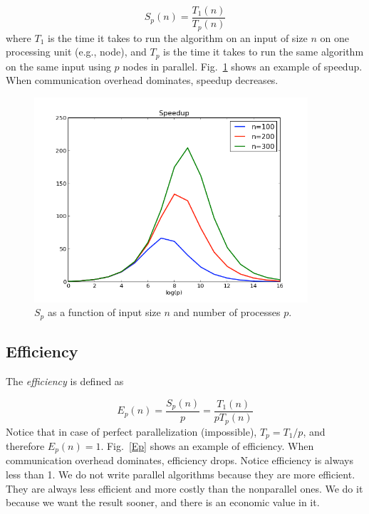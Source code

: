 \documentclass[justified,sixbynine]{tufte-book}
\theoremstyle{plain}%
\theoremstyle{definition}
\theoremstyle{remark}
\begin{document}
\begin{fullwidth}
\begin{equation}
S_p(n) = \frac{T_1(n)}{T_p(n)}
\end{equation}
where $T_1$ is the time it takes to run the algorithm on an input of size $n$ on one processing unit (e.g., node), and $T_p$ is the time it takes to run the same algorithm on the same input using $p$ nodes in parallel. Fig.~\ref{Sp} shows an example of speedup. When communication overhead dominates, speedup decreases.

\begin{figure}[ht]
\centering\includegraphics[width=4in]{images/Sp.png}
\caption{$S_p$ as a function of input size $n$ and number of processes $p$.\label{Sp}}
\end{figure}

\goodbreak\subsection{Efficiency}

The {\it efficiency} is defined as

\begin{equation}
E_p(n) = \frac{S_p(n)}{p} = \frac{T_1(n)}{p T_p(n)}
\end{equation}
Notice that in case of perfect parallelization (impossible), $T_p=T_1/p$, and therefore $E_p(n)=1$. Fig.~\ref{Ep} shows an example of efficiency. When communication overhead dominates, efficiency drops. Notice efficiency is always less than 1. We do not write parallel algorithms because they are more efficient. They are always less efficient and more costly than the nonparallel ones. We do it because we want the result sooner, and there is an economic value in it.


\end{fullwidth}
\end{document}

